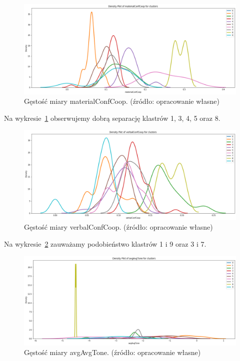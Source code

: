 \documentclass[11pt]{report}
\begin{document}
    \begin{figure}[!htp]
        \centering
        \includegraphics[width=\linewidth]{fig/CLUST/density_materialConfCoop.png}
        \caption{Gęstość miary materialConfCoop. (źródło: opracowanie własne)}
        \label{fig:density_materialconfcoop}
    \end{figure}

    Na wykresie~\ref{fig:density_materialconfcoop} obserwujemy dobrą separację klastrów 1, 3, 4, 5 oraz 8.

    \begin{figure}[!htp]
        \centering
        \includegraphics[width=\linewidth]{fig/CLUST/density_verbalConfCoop.png}
        \caption{Gęstość miary verbalConfCoop. (źródło: opracowanie własne)}
        \label{fig:density_verbalconfcoop}
    \end{figure}

    Na wykresie~\ref{fig:density_verbalconfcoop} zauważamy podobieństwo klastrów 1 i 9 oraz 3 i 7.

    \begin{figure}[!htp]
        \centering
        \includegraphics[width=\linewidth]{fig/CLUST/density_avgAvgTone.png}
        \caption{Gęstość miary avgAvgTone. (źródło: opracowanie własne)}
        \label{fig:density_avgavgtone}
    \end{figure}
\end{document}
